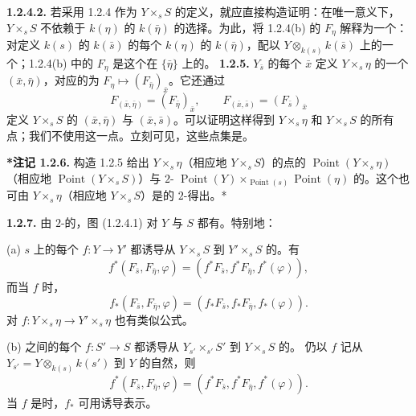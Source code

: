 \textbf{1.2.4.2.} 若采用 1.2.4 作为 $Y\times_sS$ 的定义，就应直接构造证明：在唯一意义下，$Y\times_sS$ 不依赖于 $k(\eta)$ 的 $k(\bar\eta)$ 的选择。为此，将 1.2.4(b) 的 $F_\eta$ 解释为一个：对定义 $k(s)$ 的 $k(\bar s)$ 的每个 $k(\eta)$ 的 $k(\bar\eta)$，配以 $Y\otimes_{k(s)}k(\bar s)$ 上的一个；1.2.4(b) 中的 $F_\eta$ 是这个在 $\{\bar\eta\}$ 上的。
\textbf{1.2.5.} $Y_{\bar s}$ 的每个 $\bar x$ 定义 $Y\times_s\eta$ 的一个 $(\bar x,\bar\eta)$，对应的为 $F_\eta\mapsto(F_{\bar\eta})_{\bar x}$。它还通过
\[F_{(\bar x,\bar\eta)}=(F_{\bar\eta})_{\bar x},\qquad F_{(\bar x,\bar s)}=(F_{\bar s})_{\bar x}\]
定义 $Y\times_sS$ 的 $(\bar x,\bar\eta)$ 与 $(\bar x,\bar s)$。可以证明这样得到 $Y\times_s\eta$ 和 $Y\times_sS$ 的所有点；我们不使用这一点。立刻可见，这些点集是。

\textbf{*注记 1.2.6.} 构造 1.2.5 给出 $Y\times_s\eta$（相应地 $Y\times_sS$）的点的 $\operatorname{Point}(Y\times_s\eta)$（相应地 $\operatorname{Point}(Y\times_sS)$）与 $2$- $\operatorname{Point}(Y)\times_{\operatorname{Point}(s)}\operatorname{Point}(\eta)$ 的。这个也可由 $Y\times_s\eta$（相应地 $Y\times_sS$）是的 $2$-得出。*

\textbf{1.2.7.} 由 $2$-的，图 (1.2.4.1) 对 $Y$ 与 $S$ 都有。特别地：

(a) $s$ 上的每个 $f:Y\to Y'$ 都诱导从 $Y\times_sS$ 到 $Y'\times_sS$ 的。有
\[f^*(F_{\bar s},F_{\bar\eta},\varphi)=(f^*F_{\bar s},f^*F_{\bar\eta},f^*(\varphi)),\tag{1.2.7.1}\]
而当 $f$ 时，
\[f_*(F_{\bar s},F_{\bar\eta},\varphi)=(f_*F_{\bar s},f_*F_{\bar\eta},f_*(\varphi)).\tag{1.2.7.2}\]
对 $f:Y\times_s\eta\to Y'\times_s\eta$ 也有类似公式。

(b) 之间的每个 $f:S'\to S$ 都诱导从 $Y_{s'}\times_{s'}S'$ 到 $Y\times_sS$ 的。
仍以 $f$ 记从 $Y_{s'}=Y\otimes_{k(s)}k(s')$ 到 $Y$ 的自然，则
\[f^*(F_{\bar s},F_{\bar\eta},\varphi)=(f^*F_{\bar s},f^*F_{\bar\eta},f^*(\varphi)).\tag{1.2.7.3}\]
当 $f$ 是时，$f_*$ 可用诱导表示。

